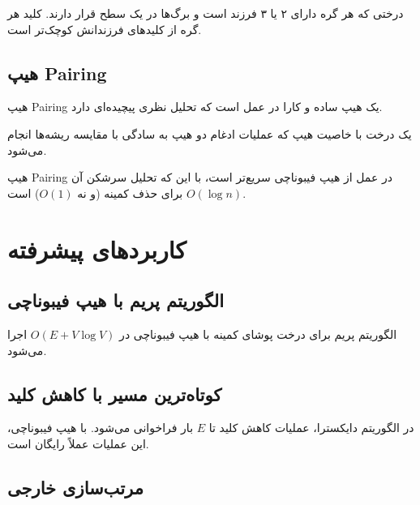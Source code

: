 \documentclass{matinbook}
\begin{document}
    \begin{definition}[هیپ دو-سه]
        درختی که هر گره دارای ۲ یا ۳ فرزند است
        و برگ‌ها در یک سطح قرار دارند.
        کلید هر گره از کلیدهای فرزندانش
        کوچک‌تر است.
        \label{def:2-3-heap}
    \end{definition}
    
    \subsection{هیپ Pairing}
    
    هیپ Pairing
    یک هیپ ساده و کارا در عمل است که
    تحلیل نظری پیچیده‌ای دارد.
    
    \begin{definition}
        یک درخت با خاصیت هیپ که
        عملیات ادغام دو هیپ به سادگی
        با مقایسه ریشه‌ها انجام می‌شود.
        \label{def:pairing-heap}
    \end{definition}
    
    \begin{remark}
        هیپ Pairing در عمل از هیپ فیبوناچی
        سریع‌تر است، با این که تحلیل سرشکن
        آن $O(\log n)$ برای حذف کمینه
        (و نه $O(1)$) است.
        \label{rem:pairing-vs-fibonacci}
    \end{remark}
    
    \section{کاربردهای پیشرفته}
    
    \subsection{الگوریتم پریم با هیپ فیبوناچی}
    
    الگوریتم پریم برای درخت
    پوشای کمینه با هیپ فیبوناچی
    در $O(E + V \log V)$ اجرا می‌شود.
    
    \subsection{کوتاه‌ترین مسیر با کاهش کلید}
    
    در الگوریتم دایکسترا،
    عملیات کاهش کلید تا $E$ بار
    فراخوانی می‌شود. با هیپ فیبوناچی،
    این عملیات عملاً رایگان است.
    
    \subsection{مرتب‌سازی خارجی}
    
\end{document}
